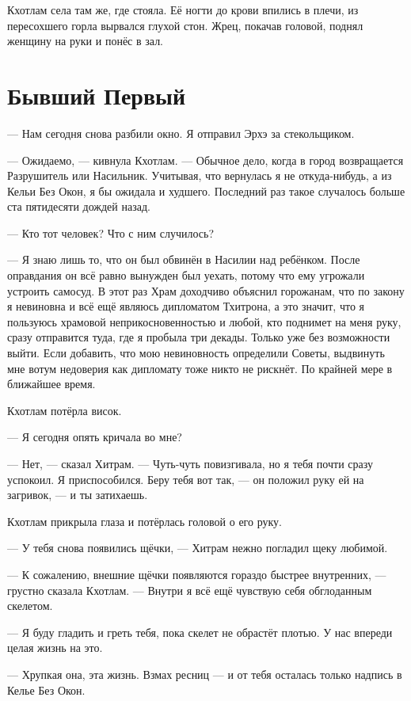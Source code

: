 Кхотлам села там же, где стояла.
Её ногти до крови впились в плечи, из пересохшего горла вырвался глухой стон.
Жрец, покачав головой, поднял женщину на руки и понёс в зал.

\section{Бывший Первый}

--- Нам сегодня снова разбили окно.
Я отправил Эрхэ за стекольщиком.

--- Ожидаемо, --- кивнула Кхотлам.
--- Обычное дело, когда в город возвращается Разрушитель или Насильник.
Учитывая, что вернулась я не откуда-нибудь, а из Кельи Без Окон, я бы ожидала и худшего.
Последний раз такое случалось больше ста пятидесяти дождей назад.

--- Кто тот человек?
Что с ним случилось?

--- Я знаю лишь то, что он был обвинён в Насилии над ребёнком.
После оправдания он всё равно вынужден был уехать, потому что ему угрожали устроить самосуд.
В этот раз Храм доходчиво объяснил горожанам, что по закону я невиновна и всё ещё являюсь дипломатом Тхитрона, а это значит, что я пользуюсь храмовой неприкосновенностью и любой, кто поднимет на меня руку, сразу отправится туда, где я пробыла три декады.
Только уже без возможности выйти.
Если добавить, что мою невиновность определили Советы, выдвинуть мне вотум недоверия как дипломату тоже никто не рискнёт.
По крайней мере в ближайшее время.

Кхотлам потёрла висок.

--- Я сегодня опять кричала во мне?

--- Нет, --- сказал Хитрам.
--- Чуть-чуть повизгивала, но я тебя почти сразу успокоил.
Я приспособился.
Беру тебя вот так, --- он положил руку ей на загривок, --- и ты затихаешь.

Кхотлам прикрыла глаза и потёрлась головой о его руку.

--- У тебя снова появились щёчки, --- Хитрам нежно погладил щеку любимой.

--- К сожалению, внешние щёчки появляются гораздо быстрее внутренних, --- грустно сказала Кхотлам.
--- Внутри я всё ещё чувствую себя обглоданным скелетом.

--- Я буду гладить и греть тебя, пока скелет не обрастёт плотью.
У нас впереди целая жизнь на это.

--- Хрупкая она, эта жизнь.
Взмах ресниц --- и от тебя осталась только надпись в Келье Без Окон.

